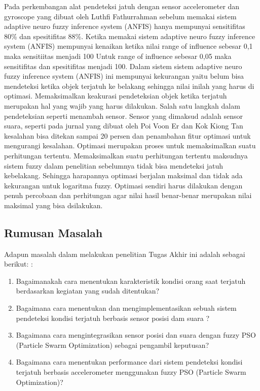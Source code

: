 \documentclass[11pt]{article}
\begin{document}
	Pada perkembangan alat pendeteksi jatuh dengan sensor accelerometer dan gyroscope  yang dibuat oleh Luthfi Fathurrahman sebelum memakai sistem adaptive neuro fuzzy inference system (ANFIS) hanya mempunyai sensitifitas  80\% dan spesitifitas 88\%.
	Ketika memakai sistem adaptive neuro fuzzy inference system (ANFIS) mempunyai kenaikan ketika nilai range of influence sebesar 0,1  maka sensitiitas menjadi 100%
	Untuk range of influence sebesar 0,05  maka sensitifitas dan spesitifitas  menjadi 100.
	Dalam sistem sistem adaptive neuro fuzzy inference system (ANFIS) ini  mempunyai kekurangan yaitu belum bisa mendeteksi ketika objek terjatuh ke belakang sehingga nilai inilah yang harus di optimasi.
	Memaksimalkan keakurasi pendeteksian objek ketika terjatuh merupakan hal yang wajib yang harus dilakukan.
	Salah satu langkah dalam pendeteksian seperti menambah sensor.
	Sensor yang dimaksud adalah sensor suara, seperti pada jurnal yang dibuat oleh  Poi Voon Er dan Kok Kiong Tan kesalahan bisa ditekan sampai 20 persen dan penambahan fitur optimasi untuk mengurangi kesalahan.
	Optimasi merupakan proses untuk memaksimalkan suatu perhitungan tertentu.
	Memaksimalkan suatu perhitungan tertentu maksudnya sistem fuzzy dalam penelitian sebelumnya tidak bisa mendeteksi jatuh kebelakang.
	Sehingga harapannya optimasi berjalan maksimal dan tidak ada kekurangan untuk logaritma fuzzy.
	Optimasi sendiri harus dilakukan dengan penuh percobaan dan perhitungan agar nilai hasil benar-benar merupakan nilai maksimal yang bisa dsilakukan.		
	
	\subsection{Rumusan Masalah}
	
		Adapun masalah dalam melakukan penelitian Tugas Akhir ini adalah sebagai berikut: :
	
	\begin{enumerate}[label=\alph*.]
		\item Bagaimanakah cara menentukan karakteristik kondisi orang saat terjatuh berdasarkan kegiatan yang sudah ditentukan?
		\item Bagaimana cara menentukan dan mengimplementasikan sebuah sistem pendeteksi kondisi terjatuh berbasis sensor posisi dam suara ?
		\item Bagaimana cara mengintegrasikan sensor posisi dan suara dengan fuzzy PSO (Particle Swarm Optimization) sebagai pengambil keputusan?
		\item Bagaimana cara menentukan performance dari sistem pendeteksi kondisi terjatuh berbasis accelerometer menggunakan fuzzy PSO (Particle Swarm Optimization)?
	
	\end{enumerate}
	
\end{document}
